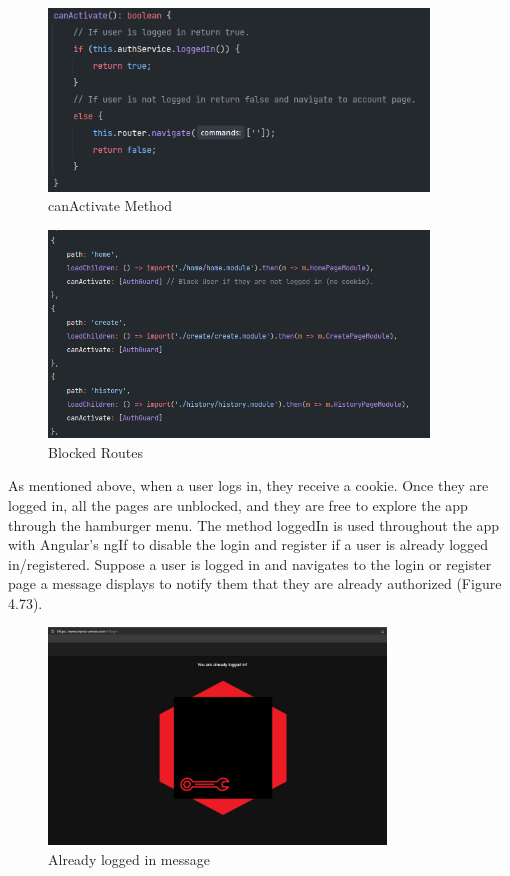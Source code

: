 \begin{figure}[H]
    \centering
    \caption{canActivate Method}
    \label{image:canActivate}
    \includegraphics[width=0.9\textwidth]{images/repota/auth_guard/can_activate.png}
\end{figure}

\begin{figure}[H]
    \centering
    \caption{Blocked Routes}
    \label{image:blocked}
    \includegraphics[width=0.9\textwidth]{images/repota/auth_guard/blocked_routes.png}
\end{figure}

As mentioned above, when a user logs in, they receive a cookie. Once they are logged in, all the pages are unblocked, and they are free to explore the app through the hamburger menu. The method loggedIn is used throughout the app with Angular's ngIf to disable the login and register if a user is already logged in/registered. Suppose a user is logged in and navigates to the login or register page a message displays to notify them that they are already authorized (Figure 4.73). 

\begin{figure}[H]
    \centering
    \caption{Already logged in message}
    \label{image:alreadyLoggedIn}
    \includegraphics[width=0.8\textwidth]{images/repota/UI/already_loggedIn.png}
\end{figure}

